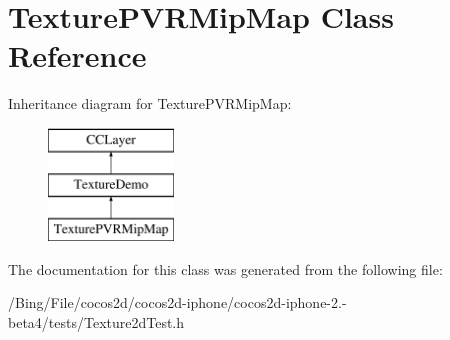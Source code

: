 \hypertarget{interface_texture_p_v_r_mip_map}{\section{Texture\-P\-V\-R\-Mip\-Map Class Reference}
\label{interface_texture_p_v_r_mip_map}
}
Inheritance diagram for Texture\-P\-V\-R\-Mip\-Map\-:\begin{figure}[H]
\begin{center}
\leavevmode
\includegraphics[height=3.000000cm]{interface_texture_p_v_r_mip_map}
\end{center}
\end{figure}


The documentation for this class was generated from the following file\-:\begin{DoxyCompactItemize}
\item 
/\-Bing/\-File/cocos2d/cocos2d-\/iphone/cocos2d-\/iphone-\/2.-\/beta4/tests/Texture2d\-Test.\-h\end{DoxyCompactItemize}
